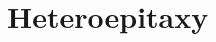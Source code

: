 \documentclass[12pt]{book}
\begin{document}

%     
    
%     
%         
%         

\section{Heteroepitaxy}
    

\newpage
\sloppy %
\printbibliography
\end{document}
